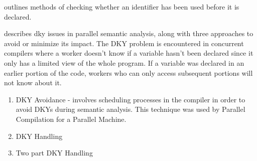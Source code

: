\cite{komathukattil_evaluating_nodate} outlines methods of checking whether an
identifier has been used before it is declared.

\cite{seshadri_investigation_1991} describes \gls{dky} issues in
parallel semantic analysis, along with three approaches to avoid or minimize its
impact. The DKY problem is encountered in concurrent compilers where a worker
doesn't know if a variable hasn't been declared since it only has a limited view
of the whole program. If a variable was declared in an earlier portion of the
code, workers who can only access subsequent portions will not know about it.

\begin{enumerate}
    \item DKY Avoidance - involves scheduling processes in the compiler in order
to avoid DKYs during semantic analysis. This technique was used by Parallel
Compilation for a Parallel Machine.
    \item DKY Handling
    \item Two part DKY Handling
\end{enumerate}



